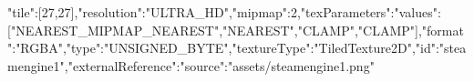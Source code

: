 {"tile":[27,27],"resolution":"ULTRA_HD","mipmap":2,"texParameters":{"values":["NEAREST_MIPMAP_NEAREST","NEAREST","CLAMP","CLAMP"]},"format":"RGBA","type":"UNSIGNED_BYTE","textureType":"TiledTexture2D","id":"steamengine1","externalReference":{"source":"assets/steamengine1.png"}}